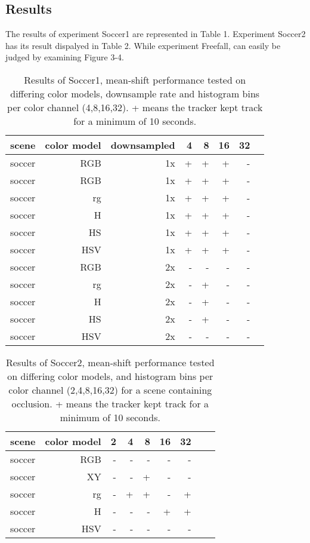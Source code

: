 \documentclass[a4paper,11pt]{article}
\begin{document}
\subsection{Results} 
The results of experiment Soccer1 are represented in Table 1. Experiment Soccer2 has its result dispalyed in Table 2. While experiment Freefall, can easily be judged by examining Figure 3-4.

\begin{table}
	\centering
	\caption{Results of Soccer1, mean-shift performance tested on differing color models, downsample rate and
	histogram bins per color channel (4,8,16,32). + means the tracker kept track for a minimum of 10 seconds.}

	\begin{tabular}{l*{7}{r|}}
		\label{table:fase1}
		scene	& 	color model	& downsampled 		   	& 4 & 8 & 16 & 32\\
		\hline
		soccer 	& 	RGB	 		& 1x		  			  & + & + & +  &  -\\
		soccer 	& 	RGB	 		& 1x		  			  & + & + & +  &  -\\
		soccer 	& 	rg	 		& 1x 		  			  & + & + & +  &  -\\
		soccer 	& 	H	 		& 1x		 			  & + & + & +  &  -\\
		soccer 	& 	HS	 		& 1x		  			  & + & + & +  &  -\\
		soccer 	& 	HSV	 		& 1x		  			  & + & + & +  &  -\\
		soccer 	& 	RGB	 		& 2x		  			  & - & - & -  &  -\\
		soccer 	& 	rg	 		& 2x 		  			  & - & + & -  &  -\\
		soccer 	& 	H	 		& 2x		  			  & - & + & -  &  -\\
		soccer 	& 	HS	 		& 2x		  			  & - & + & -  &  -\\
		soccer 	& 	HSV	 		& 2x		  			  & - & - & -  &  -\\
	\end{tabular}	
\end{table}

\begin{table}
	\centering
	\caption{Results of Soccer2, mean-shift performance tested on differing color models, and histogram bins per color channel (2,4,8,16,32) for a scene containing occlusion. + means the tracker kept track for a minimum of 10 seconds.} 
	\begin{tabular}{l*{8}{r|}}
		\label{table:fase2}
		scene	& 	color model	&  2 & 4 & 8 & 16 & 32\\
		\hline
		soccer 	& 	RGB	 		&  - & - & - & - & -\\
		soccer 	& 	XY	 		&  - & - & + & - & -\\
		soccer 	& 	rg	 		&  - & + & + & - & +\\
		soccer 	& 	H	 		&  - & - & - & + & +\\
		soccer 	& 	HSV	 		&  - & - & - & - & -\\ 
	\end{tabular}	
\end{table}	
\end{document}
